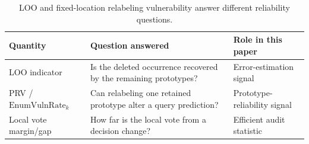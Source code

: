 \begin{table}[t]
\centering
\small
\begin{tabularx}{\linewidth}{@{}YYY@{}}
\toprule
Quantity & Question answered & Role in this paper \\
\midrule
LOO indicator & Is the deleted occurrence recovered by the remaining prototypes? & Error-estimation signal \\
PRV / $\mathrm{EnumVulnRate}_k$ & Can relabeling one retained prototype alter a query prediction? & Prototype-reliability signal \\
Local vote margin/gap & How far is the local vote from a decision change? & Efficient audit statistic \\
\bottomrule
\end{tabularx}
\caption{LOO and fixed-location relabeling vulnerability answer different reliability questions.}
\label{tab:paa-notions}
\end{table}
